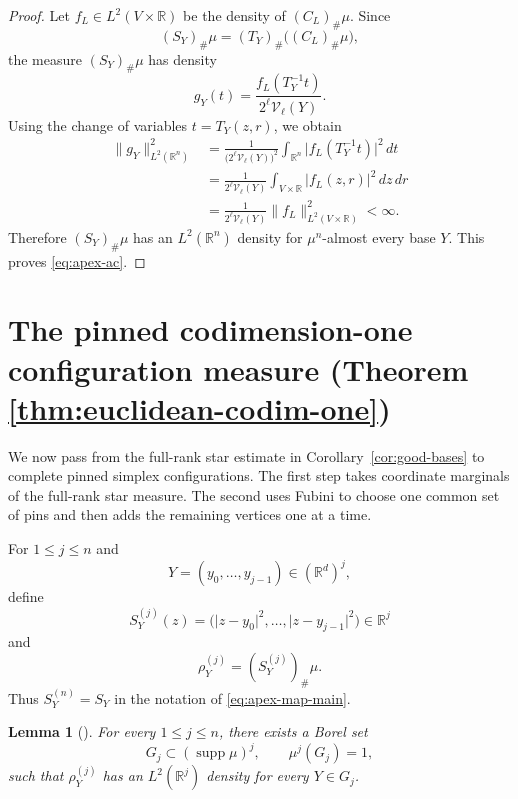 \documentclass[11pt]{article}
\newtheorem{lemma}[theorem]{Lemma}
\theoremstyle{remark}
\newcommand{\R}{\mathbb R}
\numberwithin{equation}{section}
\newcommand{\1}{\mathbf 1}
\begin{document}
\begin{proof}
Let \(f_L\in L^2(V\times\R)\) be the density of \((C_L)_\#\mu\).
Since
\[
(S_Y)_\#\mu
=
(T_Y)_\#\bigl((C_L)_\#\mu\bigr),
\]
the measure \((S_Y)_\#\mu\) has density
\[
g_Y(t)
=
\frac{f_L(T_Y^{-1}t)}
     {2^\ell\mathcal V_\ell(Y)}.
\]
Using the change of variables \(t=T_Y(z,r)\), we obtain
\[
\begin{aligned}
\|g_Y\|_{L^2(\R^n)}^2
&=
\frac{1}{\bigl(2^\ell\mathcal V_\ell(Y)\bigr)^2}
\int_{\R^n}
\bigl|f_L(T_Y^{-1}t)\bigr|^2\,dt \\
&=
\frac{1}{2^\ell\mathcal V_\ell(Y)}
\int_{V\times\R}|f_L(z,r)|^2\,dz\,dr \\
&=
\frac{1}{2^\ell\mathcal V_\ell(Y)}
\|f_L\|_{L^2(V\times\R)}^2
<\infty.
\end{aligned}
\]
Therefore \((S_Y)_\#\mu\) has an \(L^2(\R^n)\) density for
\(\mu^n\)-almost every base \(Y\). This proves
\eqref{eq:apex-ac}.
\end{proof}









\section{The pinned codimension-one configuration measure (Theorem \ref{thm:euclidean-codim-one})}
\label{sec:assembly}

We now pass from the full-rank star estimate in
Corollary~\ref{cor:good-bases} to complete pinned simplex
configurations.  The first step takes coordinate marginals of the
full-rank star measure.  The second uses Fubini to choose one common
set of pins and then adds the remaining vertices one at a time.

For \(1\leq j\leq n\) and
\[
Y=(y_0,\ldots,y_{j-1})\in(\R^d)^j,
\]
define
\[
S_Y^{(j)}(z)
=
\bigl(
\lvert z-y_0\rvert^2,\ldots,\lvert z-y_{j-1}\rvert^2
\bigr)
\in\R^j
\]
and
\[
\rho_Y^{(j)}=(S_Y^{(j)})_\#\mu.
\]
Thus \(S_Y^{(n)}=S_Y\) in the notation of
\eqref{eq:apex-map-main}.



\begin{lemma}[]
\label{lem:codim-marginal-descent}
For every $1\le j\le n$, there exists a Borel set
\[
G_j\subset (\operatorname{supp}\mu)^j,
\qquad
\mu^j(G_j)=1,
\]
such that $\rho_Y^{(j)}$ has an $L^2(\mathbb R^j)$ density for every
$Y\in G_j$.
\end{lemma}
\end{document}
